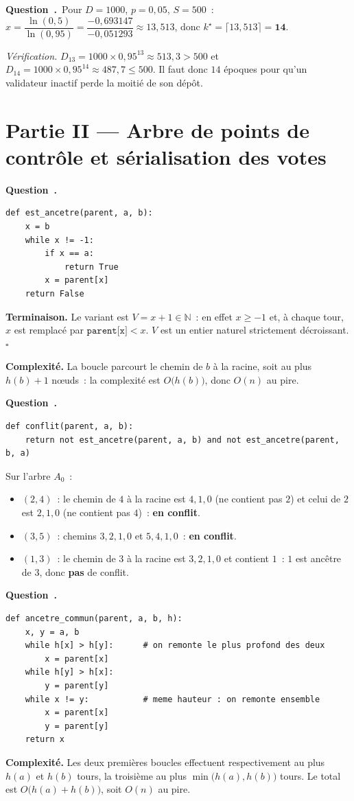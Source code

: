 \documentclass[11pt,a4paper]{article}
\renewcommand{\Q}{\medskip\par\stepcounter{qcnt}\noindent\textbf{\color{cnc}Question~\theqcnt.}~}
\begin{document}
\Q Pour $D=1000$, $p=0{,}05$, $S=500$~:
$x = \dfrac{\ln(0{,}5)}{\ln(0{,}95)} = \dfrac{-0{,}693147}{-0{,}051293} \approx 13{,}513$,
donc $k^{\star}=\lceil 13{,}513\rceil = \mathbf{14}$.

\emph{Vérification.} $D_{13}=1000\times0{,}95^{13}\approx 513{,}3>500$ et
$D_{14}=1000\times0{,}95^{14}\approx 487{,}7\le 500$. Il faut donc $14$ époques pour qu'un
validateur inactif perde la moitié de son dépôt.

\section*{Partie II --- Arbre de points de contrôle et sérialisation des votes}

\Q
\begin{lstlisting}
def est_ancetre(parent, a, b):
    x = b
    while x != -1:
        if x == a:
            return True
        x = parent[x]
    return False
\end{lstlisting}
\textbf{Terminaison.} Le variant est $V=x+1\in\mathbb{N}$~: en effet $x\ge -1$ et, à chaque
tour, $x$ est remplacé par $\texttt{parent[x]}<x$. $V$ est un entier naturel strictement
décroissant. \hfill$\square$

\textbf{Complexité.} La boucle parcourt le chemin de $b$ à la racine, soit au plus
$h(b)+1$ n\oe uds~: la complexité est $O\big(h(b)\big)$, donc $O(n)$ au pire.

\Q
\begin{lstlisting}
def conflit(parent, a, b):
    return not est_ancetre(parent, a, b) and not est_ancetre(parent, b, a)
\end{lstlisting}
Sur l'arbre $A_0$~:
\begin{itemize}[leftmargin=1.4em,itemsep=1pt]
\item $(2,4)$~: le chemin de $4$ à la racine est $4,1,0$ (ne contient pas $2$) et celui de
$2$ est $2,1,0$ (ne contient pas $4$)~: \textbf{en conflit}.
\item $(3,5)$~: chemins $3,2,1,0$ et $5,4,1,0$~: \textbf{en conflit}.
\item $(1,3)$~: le chemin de $3$ à la racine est $3,2,1,0$ et contient $1$~: $1$ est ancêtre
de $3$, donc \textbf{pas} de conflit.
\end{itemize}

\Q
\begin{lstlisting}
def ancetre_commun(parent, a, b, h):
    x, y = a, b
    while h[x] > h[y]:      # on remonte le plus profond des deux
        x = parent[x]
    while h[y] > h[x]:
        y = parent[y]
    while x != y:           # meme hauteur : on remonte ensemble
        x = parent[x]
        y = parent[y]
    return x
\end{lstlisting}
\textbf{Complexité.} Les deux premières boucles effectuent respectivement au plus $h(a)$ et
$h(b)$ tours, la troisième au plus $\min\big(h(a),h(b)\big)$ tours. Le total est
$O\big(h(a)+h(b)\big)$, soit $O(n)$ au pire.
\end{document}
